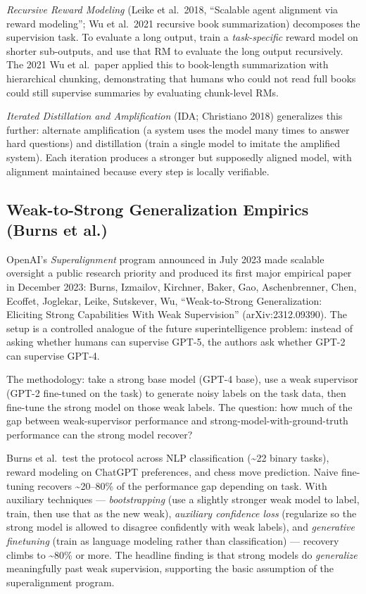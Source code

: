 \documentclass{article}
\begin{document}
\emph{Recursive Reward Modeling} (Leike et al.~2018, ``Scalable agent alignment via reward modeling''; Wu et al.~2021 recursive book summarization) decomposes the supervision task. To evaluate a long output, train a \emph{task-specific} reward model on shorter sub-outputs, and use that RM to evaluate the long output recursively. The 2021 Wu et al.~paper applied this to book-length summarization with hierarchical chunking, demonstrating that humans who could not read full books could still supervise summaries by evaluating chunk-level RMs.

\emph{Iterated Distillation and Amplification} (IDA; Christiano 2018) generalizes this further: alternate amplification (a system uses the model many times to answer hard questions) and distillation (train a single model to imitate the amplified system). Each iteration produces a stronger but supposedly aligned model, with alignment maintained because every step is locally verifiable.

\subsection{Weak-to-Strong Generalization Empirics (Burns et al.)}\label{weak-to-strong-generalization-empirics-burns-et-al.}

OpenAI's \emph{Superalignment} program announced in July 2023 made scalable oversight a public research priority and produced its first major empirical paper in December 2023: Burns, Izmailov, Kirchner, Baker, Gao, Aschenbrenner, Chen, Ecoffet, Joglekar, Leike, Sutskever, Wu, ``Weak-to-Strong Generalization: Eliciting Strong Capabilities With Weak Supervision'' (arXiv:2312.09390). The setup is a controlled analogue of the future superintelligence problem: instead of asking whether humans can supervise GPT-5, the authors ask whether GPT-2 can supervise GPT-4.

The methodology: take a strong base model (GPT-4 base), use a weak supervisor (GPT-2 fine-tuned on the task) to generate noisy labels on the task data, then fine-tune the strong model on those weak labels. The question: how much of the gap between weak-supervisor performance and strong-model-with-ground-truth performance can the strong model recover?

Burns et al.~test the protocol across NLP classification (\textasciitilde22 binary tasks), reward modeling on ChatGPT preferences, and chess move prediction. Naive fine-tuning recovers \textasciitilde20--80\% of the performance gap depending on task. With auxiliary techniques --- \emph{bootstrapping} (use a slightly stronger weak model to label, train, then use that as the new weak), \emph{auxiliary confidence loss} (regularize so the strong model is allowed to disagree confidently with weak labels), and \emph{generative finetuning} (train as language modeling rather than classification) --- recovery climbs to \textasciitilde80\% or more. The headline finding is that strong models do \emph{generalize} meaningfully past weak supervision, supporting the basic assumption of the superalignment program.
\end{document}
